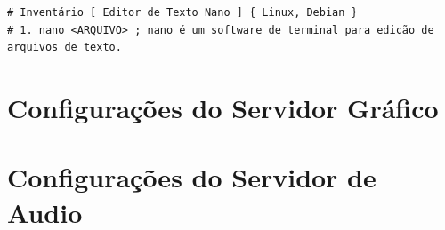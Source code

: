 \documentclass[12pt,a4paper]{article}
\begin{document}
\begin{lstlisting}
# Inventário [ Editor de Texto Nano ] { Linux, Debian }
# 1. nano <ARQUIVO> ; nano é um software de terminal para edição de arquivos de texto.
\end{lstlisting}





\section*{Configurações do Servidor Gráfico}


\section*{Configurações do Servidor de Audio}
\end{document}
